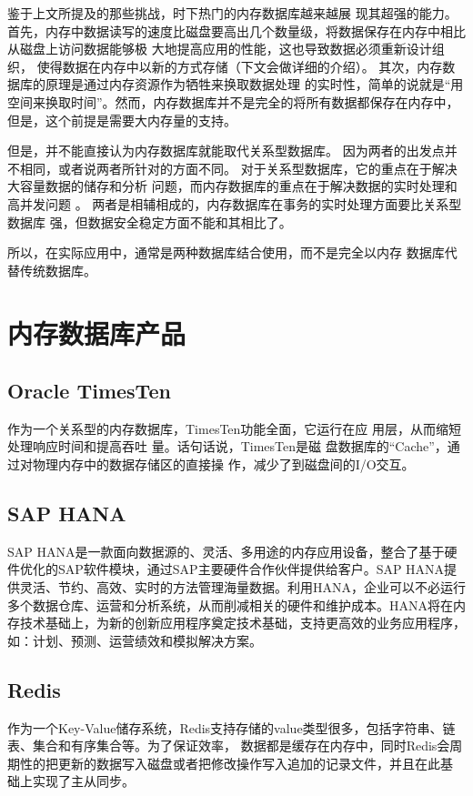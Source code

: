 \documentclass{zjutthesis}
\begin{document}
鉴于上文所提及的那些挑战，时下热门的内存数据库越来越展
现其超强的能力。首先，内存中数据读写的速度比磁盘要高出几个数量级，将数据保存在内存中相比从磁盘上访问数据能够极
大地提高应用的性能\cite{ref:2}，这也导致数据必须重新设计组织，
使得数据在内存中以新的方式存储（下文会做详细的介绍）。
其次，内存数据库的原理是通过内存资源作为牺牲来换取数据处理
的实时性，简单的说就是“用空间来换取时间”。然而，内存数据库并不是完全的将所有数据都保存在内存中，但是，这个前提是需要大内存量的支持。

但是，并不能直接认为内存数据库就能取代关系型数据库。
因为两者的出发点并不相同，或者说两者所针对的方面不同。
对于关系型数据库，它的重点在于解决大容量数据的储存和分析
问题，而内存数据库的重点在于解决数据的实时处理和高并发问题
\cite{ref:3}。
两者是相辅相成的，内存数据库在事务的实时处理方面要比关系型数据库
强，但数据安全稳定方面不能和其相比了。

所以，在实际应用中\cite{ref:4}，通常是两种数据库结合使用，而不是完全以内存
数据库代替传统数据库。

\section{内存数据库产品}
\subsection{Oracle TimesTen}
作为一个关系型的内存数据库，TimesTen\cite{bworld}功能全面，它运行在应
用层，从而缩短处理响应时间和提高吞吐
量。话句话说，TimesTen是磁
盘数据库的“Cache”，通过对物理内存中的数据存储区的直接操
作，减少了到磁盘间的I/O交互。

\subsection{SAP HANA}
SAP HANA\cite{farber2012sap}是一款面向数据源的、灵活、多用途的内存应用设备，整合了基于硬件优化的SAP软件模块，通过SAP主要硬件合作伙伴提供给客户。SAP HANA提供灵活、节约、高效、实时的方法管理海量数据。利用HANA，企业可以不必运行多个数据仓库、运营和分析系统，从而削减相关的硬件和维护成本。HANA将在内存技术基础上，为新的创新应用程序奠定技术基础，支持更高效的业务应用程序，如：计划、预测、运营绩效和模拟解决方案。

\subsection{Redis}
作为一个Key-Value储存系统，Redis\cite{web:Redis}支持存储的value类型很多，包括字符串、链表、集合和有序集合等。为了保证效率，
数据都是缓存在内存中，同时Redis会周期性的把更新的数据写入磁盘或者把修改操作写入追加的记录文件，并且在此基
础上实现了主从同步。
\end{document}
